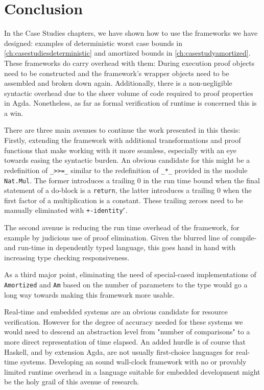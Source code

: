 
\chapter{Conclusion}
In the Case Studies chapters, we have shown how to use the frameworks we have designed: examples of deterministic worst case bounds in \autoref{ch:casestudiesdeterministic} and amortized bounds in \autoref{ch:casestudyamortized}. These frameworks do carry overhead with them: During execution proof objects need to be constructed and the framework's wrapper objects need to be assembled and broken down again. Additionally, there is a non-negligible syntactic overhead due to the sheer volume of code required to proof properties in Agda. Nonetheless, as far as formal verification of runtime is concerned this is a win.

There are three main avenues to continue the work presented in this thesis: Firstly, extending the framework with additional transformations and proof functions that make working with it more seamless, especially with an eye towards easing the syntactic burden. An obvious candidate for this might be a redefinition of \texttt{\_>>=\_} similar to the redefinition of \texttt{\_*\_} provided in the module \texttt{Nat.Mul}. The former introduces a trailing $0$ in the run time bound when the final statement of a do-block is a \texttt{return}, the latter introduces a trailing $0$ when the first factor of a multiplication is a constant. These trailing zeroes need to be manually eliminated with \texttt{+-identity$^r$}.

The second avenue is reducing the run time overhead of the framework, for example by judicious use of proof elimination. Given the blurred line of compile- and run-time in dependently typed language, this goes hand in hand with increasing type checking responsiveness.

As a third major point, eliminating the need of special-cased implementations of \texttt{Amortized} and \texttt{Am} based on the number of parameters to the type would go a long way towards making this framework more usable.

Real-time and embedded systems are an obvious candidate for resource verification. However for the degree of accuracy needed for these systems we would need to descend an abstraction level from "number of comparisons" to a more direct representation of time elapsed. An added hurdle is of course that Haskell, and by extension Agda, are not usually first-choice languages for real-time systems. Developing an sound wall-clock framework with no or provably limited runtime overhead in a language suitable for embedded development might be the holy grail of this avenue of research.

